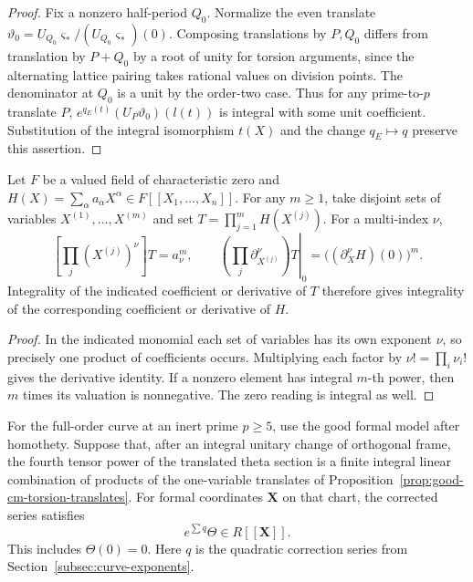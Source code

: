 \begin{proof}
Fix a
nonzero half-period \(Q_0\). Normalize the even translate
\(\vartheta_0=U_{Q_0}\varsigma_*/(U_{Q_0}\varsigma_*)(0)\).
Composing translations by \(P,Q_0\) differs from translation
by \(P+Q_0\) by a root of unity for torsion arguments, since
the alternating lattice pairing takes rational values on
division points. The denominator at \(Q_0\) is a unit by the
order-two case. Thus for any prime-to-\(p\) translate \(P\),
\(e^{q_E(t)}(U_P\vartheta_0)(l(t))\) is integral with some
unit coefficient. Substitution of the integral isomorphism
\(t(X)\) and the change \(q_E\mapsto q\) preserve this
assertion.

\end{proof}

\begin{auxlemma}
\label{lem:cm-disjoint-tensor}
Let \(F\) be a valued field of characteristic zero and
\(H(X)=\sum_\alpha a_\alpha X^\alpha\in F[[X_1,\ldots,X_n]]\).
For any \(m\ge1\), take disjoint sets of variables \(X^{(1)},\ldots,X^{(m)}\)
and set \(T=\prod_{j=1}^m H(X^{(j)})\). For a multi-index \(\nu\),
\[
 \left[\prod_j(X^{(j)})^\nu\right]T=a_\nu^m,\qquad
 \left.\left(\prod_j\partial_{X^{(j)}}^\nu\right)T\right|_0
         =\bigl((\partial_X^\nu H)(0)\bigr)^m .
\]
Integrality of the indicated coefficient or derivative of \(T\)
therefore gives integrality of the corresponding coefficient or derivative of \(H\).
\end{auxlemma}

\begin{proof}
In the indicated monomial each set of variables has its own exponent \(\nu\),
so precisely one product of coefficients occurs. Multiplying each factor
by \(\nu!=\prod_i\nu_i!\) gives the derivative identity. If a nonzero
element has integral \(m\)-th power, then \(m\) times its valuation is
nonnegative. The zero reading is integral as well.
\end{proof}

\begin{proposition}\label{prop:inert-cm-chart}
For the full-order curve at an inert prime \(p\ge5\),
use the good formal model after homothety. Suppose that, after an integral unitary change of orthogonal frame,
the fourth tensor power of the translated theta section is a finite
integral linear combination of products of the one-variable
translates of Proposition~\ref{prop:good-cm-torsion-translates}.
For formal coordinates \(\mathbf X\) on that chart, the corrected series satisfies
\[
 e^{\sum q}\Theta\in R[\![\mathbf X]\!].
\]
This includes \(\Theta(0)=0\). Here \(q\) is the quadratic correction
series from Section~\ref{subsec:curve-exponents}.
\end{proposition}

